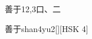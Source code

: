 \begin{entry}{善于}{12,3}{⼝、⼆}
  \begin{phonetics}{善于}{shan4yu2}[][HSK 4]
  \end{phonetics}
\end{entry}
